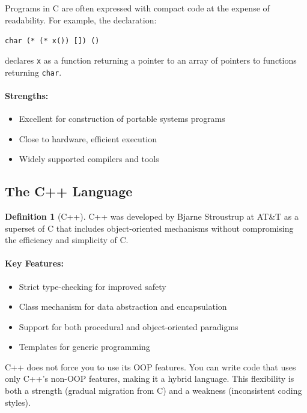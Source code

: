 \documentclass[11pt, a4paper, notitlepage]{report}
\theoremstyle{definition}
\newtheorem{definition}[theorem]{Definition}
\theoremstyle{remark}
\theoremstyle{definition}
\begin{document}
\begin{warning}[title={C Code Readability}]
Programs in C are often expressed with compact code at the expense of readability. For example, the declaration:
\begin{center}
\texttt{char (* (* x()) []) ()}
\end{center}
declares \texttt{x} as a function returning a pointer to an array of pointers to functions returning \texttt{char}.
\end{warning}

\paragraph{Strengths:}
\begin{itemize}
  \item Excellent for construction of portable systems programs
  \item Close to hardware, efficient execution
  \item Widely supported compilers and tools
\end{itemize}

\subsection{The C++ Language}

\begin{definition}[C++]
\label{def:ch1-cpp}
C++ was developed by Bjarne Stroustrup at AT\&T as a superset of C that includes object-oriented mechanisms without compromising the efficiency and simplicity of C.
\end{definition}

\paragraph{Key Features:}
\begin{itemize}
  \item Strict type-checking for improved safety
  \item Class mechanism for data abstraction and encapsulation
  \item Support for both procedural and object-oriented paradigms
  \item Templates for generic programming
\end{itemize}

\begin{examtip}[title={C++ is Not Pure OOP}]
C++ does not force you to use its OOP features. You can write code that uses only C++'s non-OOP features, making it a hybrid language. This flexibility is both a strength (gradual migration from C) and a weakness (inconsistent coding styles).
\end{examtip}
\end{document}
